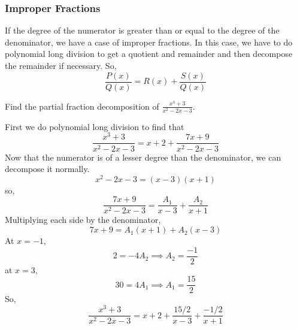 \subsubsection{Improper Fractions}
\noindent
If the degree of the numerator is greater than or equal to the degree of the denominator, we have a case of improper fractions. In this case, we have to do polynomial long division to get a quotient and remainder and then decompose the remainder if necessary. So,
\begin{equation*}
	\frac{P(x)}{Q(x)} = R(x) + \frac{S(x)}{Q(x)}
\end{equation*}

\begin{example}
	Find the partial fraction decomposition of $\frac{x^3+3}{x^2-2x-3}$.
\end{example}
\noindent
First we do polynomial long division to find that
\begin{equation*}
	\frac{x^3+3}{x^2-2x-3} = x + 2 + \frac{7x+9}{x^2-2x-3}
\end{equation*}
Now that the numerator is of a lesser degree than the denominator, we can decompose it normally.
\begin{equation*}
	x^2-2x-3 = (x-3)(x+1)
\end{equation*}
so,
\begin{equation*}
	\frac{7x+9}{x^2-2x-3} = \frac{A_1}{x-3} + \frac{A_2}{x+1}
\end{equation*}
Multiplying each side by the denominator,
\begin{equation*}
	7x+9 = A_1(x+1) + A_2(x-3)
\end{equation*}
At $x=-1$,
\begin{equation*}
	2 = -4A_2 \implies A_2 = \frac{-1}{2}
\end{equation*}
at $x=3$,
\begin{equation*}
	30 = 4A_1 \implies A_1 = \frac{15}{2}
\end{equation*}
So,
\begin{equation*}
	\frac{x^3+3}{x^2-2x-3} = x + 2 + \frac{15/2}{x-3} + \frac{-1/2}{x+1}
\end{equation*}